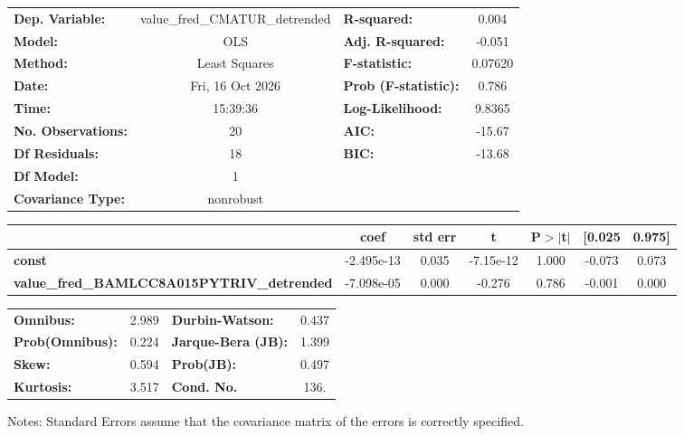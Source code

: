 \begin{center}
\begin{tabular}{lclc}
\toprule
\textbf{Dep. Variable:}                            & value\_fred\_CMATUR\_detrended & \textbf{  R-squared:         } &     0.004   \\
\textbf{Model:}                                    &              OLS               & \textbf{  Adj. R-squared:    } &    -0.051   \\
\textbf{Method:}                                   &         Least Squares          & \textbf{  F-statistic:       } &   0.07620   \\
\textbf{Date:}                                     &        Fri, 16 Oct 2026        & \textbf{  Prob (F-statistic):} &    0.786    \\
\textbf{Time:}                                     &            15:39:36            & \textbf{  Log-Likelihood:    } &    9.8365   \\
\textbf{No. Observations:}                         &                 20             & \textbf{  AIC:               } &    -15.67   \\
\textbf{Df Residuals:}                             &                 18             & \textbf{  BIC:               } &    -13.68   \\
\textbf{Df Model:}                                 &                  1             & \textbf{                     } &             \\
\textbf{Covariance Type:}                          &           nonrobust            & \textbf{                     } &             \\
\bottomrule
\end{tabular}
\begin{tabular}{lcccccc}
                                                   & \textbf{coef} & \textbf{std err} & \textbf{t} & \textbf{P$> |$t$|$} & \textbf{[0.025} & \textbf{0.975]}  \\
\midrule
\textbf{const}                                     &   -2.495e-13  &        0.035     & -7.15e-12  &         1.000        &       -0.073    &        0.073     \\
\textbf{value\_fred\_BAMLCC8A015PYTRIV\_detrended} &   -7.098e-05  &        0.000     &    -0.276  &         0.786        &       -0.001    &        0.000     \\
\bottomrule
\end{tabular}
\begin{tabular}{lclc}
\textbf{Omnibus:}       &  2.989 & \textbf{  Durbin-Watson:     } &    0.437  \\
\textbf{Prob(Omnibus):} &  0.224 & \textbf{  Jarque-Bera (JB):  } &    1.399  \\
\textbf{Skew:}          &  0.594 & \textbf{  Prob(JB):          } &    0.497  \\
\textbf{Kurtosis:}      &  3.517 & \textbf{  Cond. No.          } &     136.  \\
\bottomrule
\end{tabular}
\end{center}

Notes: \newline
 [1] Standard Errors assume that the covariance matrix of the errors is correctly specified.